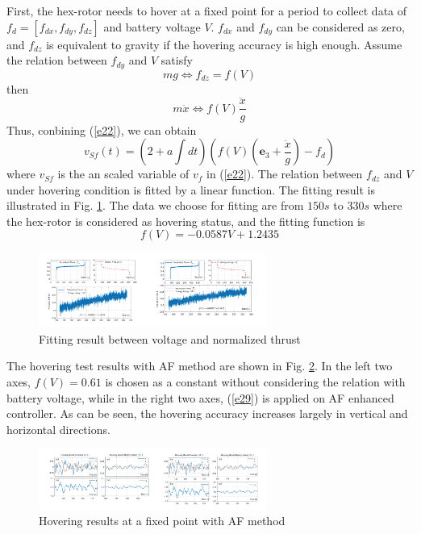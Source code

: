 \documentclass[letterpaper, 10 pt, conference]{ieeeconf}  %
\begin{document}
First, the hex-rotor needs to hover at a fixed point for a period to collect data of $f_d=[f_{dx},f_{dy},f_{dz}]$ and battery voltage $V$.
$f_{dx}$ and $f_{dy}$ can be considered as zero, and $f_{dz}$ is equivalent to gravity if the hovering accuracy is high enough.
Assume the relation between $f_{dy}$ and $V$ satisfy
\begin{equation}
    mg \Leftrightarrow f_{dz}=f(V)
    \label{e26}
\end{equation}
then
\begin{equation}
    m\ddot{x} \Leftrightarrow f(V)\frac{\ddot{x}}{g}
    \label{e27}
\end{equation}
Thus, conbining (\ref{e22}), we can obtain
\begin{equation}
    v_{Sf}(t)=(2+a\int dt)\left(
        f(V)(\bm{e}_3+\frac{\ddot{x}}{g}) - f_d 
        \right)
    \label{e28}
\end{equation}
where $v_{Sf}$ is the an scaled variable of $v_{f}$ in (\ref{e22}).
The relation between $f_{dz}$ and $V$ under hovering condition is fitted by a linear function.
The fitting result is illustrated in Fig. \ref{f9}.
The data we choose for fitting are from $150s$ to $330s$ where the hex-rotor is considered as hovering status, and the fitting function is
\begin{equation}
    f(V) = -0.0587V + 1.2435
    \label{e29}
\end{equation}
\begin{figure}[t]
    \centering
    \includegraphics[width=2.95in]{illustrations/fig9.pdf}
    \caption{Fitting result between voltage and normalized thrust}
    \label{f9}
\end{figure}

The hovering test results with AF method are shown in Fig. \ref{f10}.
In the left two axes, $f(V) = 0.61$ is chosen as a constant without considering the relation with battery voltage, while in the right two axes, (\ref{e29}) is applied on AF enhanced controller.
As can be seen, the hovering accuracy increases largely in vertical and horizontal directions.
\begin{figure}[t]
    \centering
    \includegraphics[width=2.95in]{illustrations/fig10.pdf}
    \caption{Hovering results at a fixed point with AF method}
    \label{f10}
\end{figure}
\end{document}
